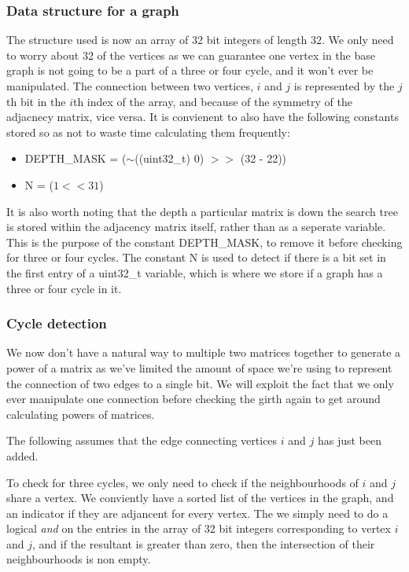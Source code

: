 \documentclass[a4paper]{article}
\begin{document}
\subsubsection{Data structure for a graph}
\label{sec:data_structure_one}
The structure used is now an array of 32 bit integers of length 32. We only need to worry about 32 of the vertices as we can guarantee one vertex in the base graph is not going to be a part of a three or four cycle, and it won't ever be manipulated. The connection between two vertices, $i$ and $j$ is represented by the $j$th bit in the $i$th index of the array, and because of the symmetry of the adjacnecy matrix, vice versa. It is convienent to also have the following constants stored so as not to waste time calculating them frequently:
\begin{itemize}
\item DEPTH\_MASK = ($\sim$((uint32\_t) 0) $>>$ (32 - 22))
\item N = ($1 << 31$)
\end{itemize}

It is also worth noting that the depth a particular matrix is down the search tree is stored within the adjacency matrix itself, rather than as a seperate variable. This is the purpose of the constant DEPTH\_MASK, to remove it before checking for three or four cycles. The constant N is used to detect if there is a bit set in the first entry of a uint32\_t variable, which is where we store if a graph has a three or four cycle in it.

\subsubsection{Cycle detection}
\label{sec:cycle_detection_one}
We now don't have a natural way to multiple two matrices together to generate a power of a matrix as we've limited the amount of space we're using to represent the connection of two edges to a single bit. We will exploit the fact that we only ever manipulate one connection before checking the girth again to get around calculating powers of matrices.

The following assumes that the edge connecting vertices $i$ and $j$ has just been added.

To check for three cycles, we only need to check if the neighbourhoods of $i$ and $j$ share a vertex. We conviently have a sorted list of the vertices in the graph, and an indicator if they are adjancent for every vertex. The we simply need to do a logical \emph{and} on the entries in the array of 32 bit integers corresponding to vertex $i$ and $j$, and if the resultant is greater than zero, then the intersection of their neighbourhoods is non empty.
\end{document}

